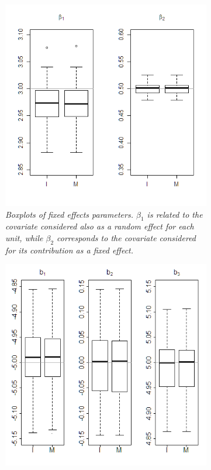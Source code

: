 \begin{figure}
	\centering
	\begin{subfigure}{0.45\textwidth}
		\includegraphics[width=\textwidth]{images/beta.png}
		\centering
		\caption{\textit{Boxplots of fixed effects parameters. $\beta_1$ is related to the covariate considered also as a random effect for each unit, while $\beta_2$ corresponds to the covariate considered for its contribution
				as a fixed effect.}}
		\label{beta}
	\end{subfigure}
	\hfill
	\begin{subfigure}{0.45\textwidth}
		\includegraphics[width=\textwidth]{images/b.png}

\end{subfigure}
\end{figure}
